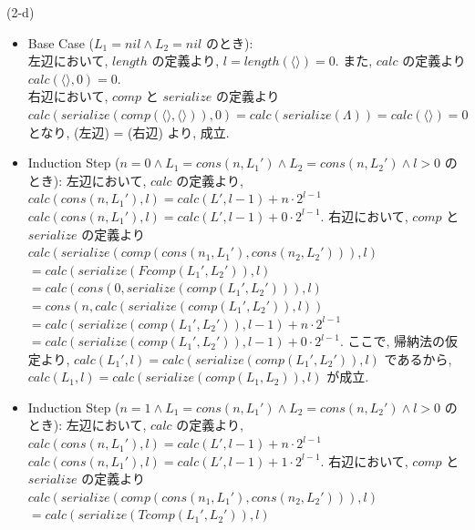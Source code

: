 \documentclass[12pt]{article}
\begin{document}
(2-d)
\begin{itemize}
    \item Base Case (\( L_1 = nil \wedge L_2 = nil \) のとき): \\
    左辺において, \( length \) の定義より, \( l = length(\langle \rangle) = 0 \). また, \( calc \) の定義より \( calc(\langle \rangle, 0) = 0\). \\
    右辺において, \( comp \) と \( serialize \) の定義より \( calc(serialize(comp(\langle \rangle, \langle \rangle)), 0) = calc(serialize(\Lambda)) = calc(\langle \rangle) = 0 \) となり, (左辺) = (右辺) より, 成立.
    \item Induction Step (\( n = 0 \wedge L_1 = cons(n, L_1') \wedge L_2 = cons(n, L_2') \wedge l > 0 \) のとき):
    左辺において, \( calc \) の定義より, \\
    \( calc(cons(n, L_1'), l) = calc(L', l - 1) + n \cdot 2^{l - 1} \) \\
    \( calc(cons(n, L_1'), l) = calc(L', l - 1) + 0 \cdot 2^{l - 1} \).
    右辺において, \( comp \) と \( serialize \) の定義より \\
    \( calc(serialize(comp(cons(n_1, L_1'), cons(n_2, L_2'))), l) \) \\
    \( = calc(serialize(Fcomp(L_1', L_2')), l) \) \\
    \( = calc(cons(0, serialize(comp(L_1', L_2'))), l) \) \\
    \( = cons(n, calc(serialize(comp(L_1', L_2')), l))  \) \\
    \( = calc(serialize(comp(L_1', L_2')), l - 1) + n \cdot 2^{l - 1} \) \\
    \( = calc(serialize(comp(L_1', L_2')), l - 1) + 0 \cdot 2^{l - 1} \).
    ここで, 帰納法の仮定より, \( calc(L_1', l) = calc(serialize(comp(L_1', L_2')), l) \) であるから, \( calc(L_1, l) = calc(serialize(comp(L_1, L_2)), l) \) が成立.
    \item Induction Step (\( n = 1 \wedge L_1 = cons(n, L_1') \wedge L_2 = cons(n, L_2') \wedge l > 0 \) のとき):
    左辺において, \( calc \) の定義より, \\
    \( calc(cons(n, L_1'), l) = calc(L', l - 1) + n \cdot 2^{l - 1} \) \\
    \( calc(cons(n, L_1'), l) = calc(L', l - 1) + 1 \cdot 2^{l - 1} \).
    右辺において, \( comp \) と \( serialize \) の定義より \\
    \( calc(serialize(comp(cons(n_1, L_1'), cons(n_2, L_2'))), l) \) \\
    \( = calc(serialize(Tcomp(L_1', L_2')), l) \) \\

\end{itemize}
\end{document}
